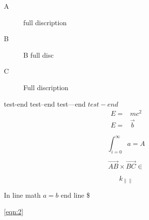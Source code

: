 \documentclass[12pt,onecolumn,a4paper,portrait]{article}
\begin{document}
\begin{description}
\item[A] full discription
\item[B] B full disc
\item[C] Full discription
\end{description}


test-end
test--end
test---end
$test-end$
\begin{align}
E=&mc^2\\E=&\vec{b}\nonumber
\end{align}





\begin{equation}
\int_{i=0}^\infty a= A
\end{equation}



\begin{equation}
\overrightarrow{AB} \times \vec{BC} \in 
\end{equation}


$$k_{\|\|}$$
%







In line math $a=b$ end line \$

\ref{eqn:2}
\end{document}
